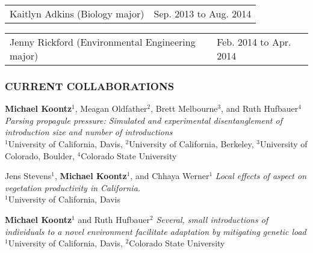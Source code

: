 \documentclass[11pt,english]{article}
\providecommand{\tabularnewline}{\\}
\begin{document}
\begin{tabular}{>{\raggedright}p{4in}>{\raggedleft}p{2in}}
Kaitlyn Adkins (Biology major) & Sep. 2013 to Aug. 2014\tabularnewline
\end{tabular}

\begin{tabular}{>{\raggedright}p{4in}>{\raggedleft}p{2in}}
Jenny Rickford (Environmental Engineering major) & Feb. 2014 to Apr. 2014
\end{tabular}


\subsubsection*{CURRENT COLLABORATIONS}
\vspace{-0.5ex}

\begin{hangparas}{0.4in}{1}

\hspace{0.575em}\textbf{Michael Koontz}$^{1}$, Meagan Oldfather$^{2}$, Brett Melbourne$^{3}$, and Ruth Hufbauer$^{4}$
\emph{Parsing propagule pressure: Simulated and experimental disentanglement of introduction size and number of introductions} \tabularnewline
$^{1}$University of California, Davis, $^{2}$University of California, Berkeley, $^{3}$University of Colorado, Boulder, $^{4}$Colorado State University 

\hspace{0.575em}Jens Stevens$^{1}$, \textbf{Michael Koontz}$^{1}$, and Chhaya Werner$^{1}$
\emph{Local effects of aspect on vegetation productivity in California.}\tabularnewline
$^{1}$University of California, Davis

\hspace{0.575em}\textbf{Michael Koontz}$^{1}$ and Ruth Hufbauer$^{2}$
\emph{Several, small introductions of individuals to a novel environment facilitate adaptation by mitigating genetic load} \tabularnewline
$^{1}$University of California, Davis, $^{2}$Colorado State University 

%

\end{hangparas}
\vspace{1ex}
\end{document}
